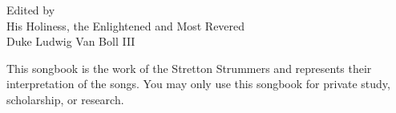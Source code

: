 \documentclass[11pt,a5paper,wordbk]{../SSSongbook}
\begin{document}
\let\cleardoublepage\clearpage %

{Edited by\\
  His Holiness, the Enlightened and Most Revered\\
Duke Ludwig Van Boll III}

\ifChordBk
\let\cleardoublepage\clearpage %
\fancyhead[R,L]{}
\tableofcontents %
\vfil
This songbook is the work of the Stretton Strummers
and represents their interpretation of the songs.
You may only use this songbook for private study,
scholarship, or research.\par
\pagebreak
\fi









\printindex
\end{document}
